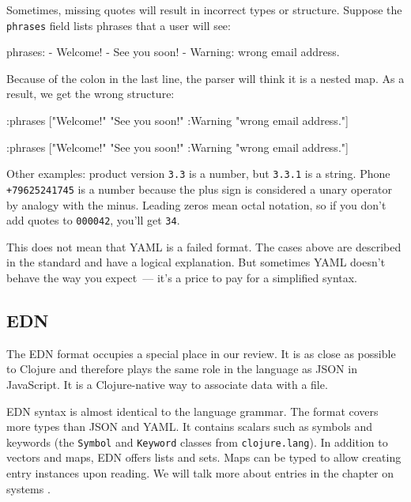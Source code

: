 Sometimes, missing quotes will result in incorrect types or structure. Suppose the \verb|phrases| field lists phrases that a user will see:

\begin{yaml}
phrases:
  - Welcome!
  - See you soon!
  - Warning: wrong email address.
\end{yaml}

Because of the colon in the last line, the parser will think it is a nested map. As a result, we get the wrong structure:

\ifnarrow

\begin{clojure}
{:phrases
 ["Welcome!"
  "See you soon!"
  {:Warning "wrong email address."}]}
\end{clojure}

\else

\begin{clojure}
{:phrases ["Welcome!"
           "See you soon!"
           {:Warning "wrong email address."}]}
\end{clojure}

\fi

Other examples: product version \verb|3.3| is a number, but \verb|3.3.1| is a string. Phone \texttt{+79625241745} is a number because the plus sign is considered a unary operator by analogy with the minus. Leading zeros mean octal notation, so if you don't add quotes to \verb|000042|, you'll get \verb|34|.

This does not mean that YAML is a failed format. The cases above are described in the standard and have a logical explanation. But sometimes YAML doesn't behave the way you expect~--- it’s a price to pay for a simplified syntax.

\subsection{EDN}


The EDN format occupies a special place in our review. It is as close as possible to Clojure and therefore plays the same role in the language as JSON in JavaScript. It is a Clojure-native way to associate data with a file.

EDN syntax is almost identical to the language grammar. The format covers more types than JSON and YAML. It contains scalars such as symbols and keywords (the \verb|Symbol| and \verb|Keyword| classes from \verb|clojure.lang|). In addition to vectors and maps, EDN offers lists and sets. Maps can be typed to allow creating entry instances upon reading. We will talk more about entries in the chapter on systems .

